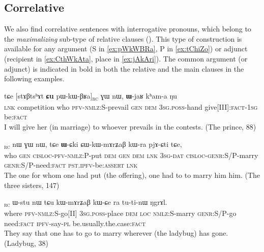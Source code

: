 \documentclass[oldfontcommands,oneside,a4paper,11pt]{article}
\newcommand{\ipa}[1]{{\phon #1}} %
\newcommand{\topic}{\textsc{dem}}
\newcommand{\rc}{\textsubscript{\textsc{rc}}}
\begin{document}
\subsection{Correlative} \label{sec:correlative}
We also find correlative sentences with interrogative pronouns, which belong to the \textit{maximalizing} sub-type of relative clauses (\citealt{grosu98maximalizing}).
 This type of construction is available for any argument (S in \ref{ex:pWkWBRa}, P in \ref{ex:tChiZo}) or adjunct (recipient in \ref{ex:CthWkAta}, place in \ref{ex:jAkAri}). The common argument (or adjunct) is indicated in bold in both the relative and the main clauses in the following examples.

  \begin{exe}
\ex \label{ex:pWkWBRa}
\gll
\ipa{tɕe}  	[\ipa{stɤβtsʰɤt}  	\textbf{\ipa{ɕu}}   	\ipa{pɯ-kɯ-βʁa}]\rc{}  	\ipa{ɣɯ}  	\ipa{nɯ},  	\ipa{\textbf{ɯ}-jaʁ}  	\ipa{kʰam-a}  	\ipa{ŋu}  \\
\textsc{lnk}  competition who \textsc{pfv-nmlz:}S-prevail \textsc{gen} \textsc{dem} \textsc{3sg.poss}-hand give[III]:\textsc{fact}-\textsc{1sg} be:\textsc{fact} \\
\glt I will give her (in marriage) to whoever prevails in the contests.  (The prince, 88)
\end{exe}




\begin{exe}
\ex \label{ex:CthWkAta}
\gll
[\textbf{\ipa{ɕu}}   	\ipa{ɣɯ}  	\ipa{ɕ-tʰɯ-kɤ-ta}]\rc{}  	\ipa{nɯ}  	\ipa{ɣɯ}  	\ipa{nɯ,}  	\ipa{tɕe}  	\ipa{\textbf{ɯ}-ɕki}  	\ipa{ɕɯ-kɯ-mɤrʑaβ}  	\ipa{kɯ-ra}  	\ipa{pjɤ-ɕti}  	\ipa{tɕe,}  \\
who \textsc{gen} \textsc{cisloc-pfv-nmlz:P}-put \topic{} \textsc{gen} \topic{} \textsc{lnk}
\textsc{3sg}-\textsc{dat} \textsc{cisloc-genr:S/P}-marry \textsc{genr:S/P-}need:\textsc{fact} \textsc{pst.ipfv}-be:\textsc{assert} \textsc{lnk} \\
\glt The one for whom one had put (the offering), one had to to marry him him. (The three sisters, 147)
\end{exe} 


\begin{exe}
\ex \label{ex:jAkAri}
\gll
[\textbf{\ipa{ŋotɕu}}  	\ipa{jɤ-kɯ-ɤri}]\rc{} 	\ipa{ɯ-stu}  	\ipa{nɯ}  	\ipa{tɕu}  	\ipa{kɯ-mɤrʑaβ}  	\ipa{kɯ-ɕe}  	\ipa{ra}  	\ipa{tu-ti-nɯ}  	\ipa{ŋgrɤl.} \\
where \textsc{pfv-nmlz:S}-go[II] \textsc{3sg.poss}-place \topic{} \textsc{loc} \textsc{nmlz:S}-marry \textsc{genr:S/P}-go need:\textsc{fact} \textsc{ipfv}-say-\textsc{pl} be.usually.the.case:\textsc{fact} \\
\glt They say that one has to go to marry wherever (the ladybug) has gone. (Ladybug, 38)
\end{exe} 
\end{document}
